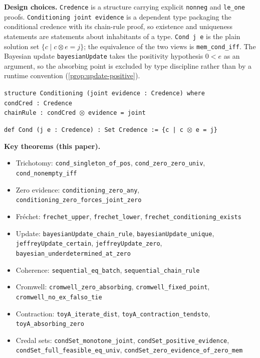 \documentclass[11pt,a4paper]{article}
\newcommand{\conjc}{\otimes}
\begin{document}
\textbf{Design choices.}
\texttt{Credence} is a structure carrying explicit \texttt{nonneg} and
\texttt{le\_one} proofs.
\texttt{Conditioning joint evidence} is a dependent type packaging the
conditional credence with its chain-rule proof, so existence and
uniqueness statements are statements about inhabitants of a type.
\texttt{Cond j e} is the plain solution set
$\{c \mid c \conjc e = j\}$; the equivalence of the two views is
\texttt{mem\_cond\_iff}.
The Bayesian update \texttt{bayesianUpdate} takes the positivity
hypothesis $0 < e$ as an argument, so the absorbing point is excluded
by type discipline rather than by a runtime convention
(\cref{prop:update-positive}).

\medskip
\noindent
\texttt{structure Conditioning (joint evidence : Credence) where}\\
\null\quad \texttt{condCred : Credence}\\
\null\quad \texttt{chainRule : condCred}~$\conjc$~\texttt{evidence = joint}

\medskip
\noindent
\texttt{def Cond (j e : Credence) : Set Credence := \{c | c}~$\conjc$~\texttt{e = j\}}

\medskip
\textbf{Key theorems (this paper).}
\begin{itemize}[nosep]
\item Trichotomy: \texttt{cond\_singleton\_of\_pos},
  \texttt{cond\_zero\_zero\_univ}, \texttt{cond\_nonempty\_iff}
\item Zero evidence: \texttt{conditioning\_zero\_any},
  \texttt{conditioning\_zero\_forces\_joint\_zero}
\item Fr\'echet: \texttt{frechet\_upper}, \texttt{frechet\_lower},
  \texttt{frechet\_conditioning\_exists}
\item Update: \texttt{bayesianUpdate\_chain\_rule},
  \texttt{bayesianUpdate\_unique}, \texttt{jeffreyUpdate\_certain},
  \texttt{jeffreyUpdate\_zero},
  \texttt{bayesian\_underdetermined\_at\_zero}
\item Coherence: \texttt{sequential\_eq\_batch},
  \texttt{sequential\_chain\_rule}
\item Cromwell: \texttt{cromwell\_zero\_absorbing},
  \texttt{cromwell\_fixed\_point}, \texttt{cromwell\_no\_ex\_falso\_tie}
\item Contraction: \texttt{toyA\_iterate\_dist},
  \texttt{toyA\_contraction\_tendsto}, \texttt{toyA\_absorbing\_zero}
\item Credal sets: \texttt{condSet\_monotone\_joint},
  \texttt{condSet\_positive\_evidence},
  \texttt{condSet\_full\_feasible\_eq\_univ},
  \texttt{condSet\_zero\_evidence\_of\_zero\_mem}
\end{itemize}
\end{document}
